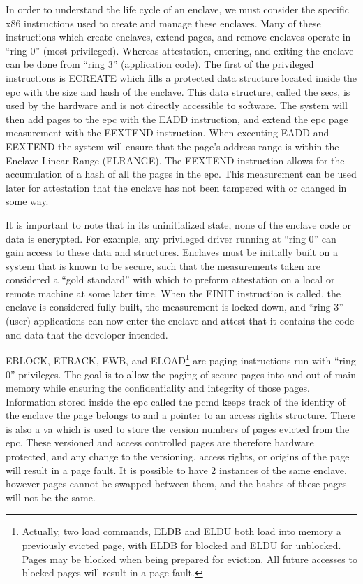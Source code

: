 In order to understand the life cycle of an enclave, we must consider the specific x86 instructions used to create and manage these enclaves. Many of these instructions which create enclaves, extend pages, and remove enclaves operate in ``ring 0'' (most privileged). Whereas attestation, entering, and exiting the enclave can be done from ``ring 3'' (application code). The first of the privileged instructions is ECREATE which fills a protected data structure located inside the \gls{epc} with the size and hash of the enclave. This data structure, called the \gls{secs}, is used by the hardware and is not directly accessible to software. The system will then add pages to the \gls{epc} with the EADD instruction, and extend the \gls{epc} page \gls{measurement} with the EEXTEND instruction. When executing EADD and EEXTEND the system will ensure that the page's address range is within the Enclave Linear Range (ELRANGE). The EEXTEND instruction allows for the accumulation of a hash of all the pages in the \gls{epc}. This measurement can be used later for \gls{attestation} that the enclave has not been tampered with or changed in some way.

It is important to note that in its uninitialized state, none of the enclave code or data is encrypted. For example, any privileged driver running at ``ring 0'' can gain access to these data and structures. Enclaves must be initially built on a system that is known to be secure, such that the measurements taken are considered a ``gold standard'' with which to preform attestation on a local or remote machine at some later time. When the EINIT instruction is called, the enclave is considered fully built, the measurement is locked down, and ``ring 3'' (user) applications can now enter the enclave and attest that it contains the code and data that the developer intended. 

EBLOCK, ETRACK, EWB, and ELOAD\footnote{Actually, two load commands, ELDB and ELDU both load into memory a previously evicted page, with ELDB for blocked and ELDU for unblocked. Pages may be blocked when being prepared for eviction. All future accesses to blocked pages will result in a page fault.} are paging instructions run with ``ring 0'' privileges. The goal is to allow the paging of secure pages into and out of main memory while ensuring the confidentiality and integrity of those pages. Information stored inside the \gls{epc} called the \gls{pcmd} keeps track of the identity of the enclave the page belongs to and a pointer to an access rights structure. There is also a \gls{va} which is used to store the version numbers of pages evicted from the \gls{epc}. These versioned and access controlled pages are therefore hardware protected, and any change to the versioning, access rights, or origins of the page will result in a page fault. It is possible to have 2 instances of the same enclave, however pages cannot be swapped between them, and the hashes of these pages will not be the same.


